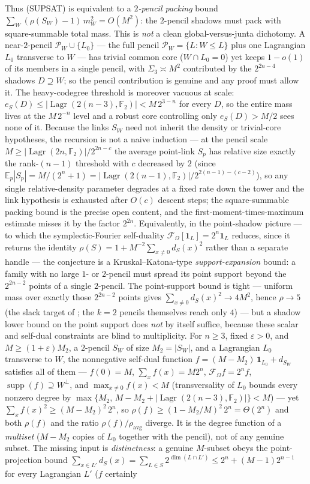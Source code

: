\documentclass[11pt,a4paper]{article}
\theoremstyle{plain}
\theoremstyle{definition}
\newcommand{\F}{\mathbb{F}}
\DeclareMathOperator{\Lagr}{Lagr}
\begin{document}
Thus (SUPSAT) is equivalent to a \emph{$2$-pencil packing} bound $\sum_W (\rho(S_W)-1)\,m_W^2 = O(M^2)$: the $2$-pencil shadows must pack with square-summable total mass. This is \emph{not} a clean global-versus-junta dichotomy. A near-$2$-pencil $\mathcal P_W \cup \{L_0\}$ --- the full pencil $\mathcal P_W = \{L : W \le L\}$ plus one Lagrangian $L_0$ transverse to $W$ --- has trivial common core ($W \cap L_0 = 0$) yet keeps $1-o(1)$ of its members in a single pencil, with $\Sigma_3 \asymp M^2$ contributed by the $2^{2n-4}$ shadows $D \supseteq W$; so the pencil contribution is genuine and any proof must allow it. The heavy-codegree threshold is moreover vacuous at scale: $e_S(D) \le |\Lagr(2(n-3),\F_2)| < M\,2^{3-n}$ for every $D$, so the entire mass lives at the $M\,2^{-n}$ level and a robust core controlling only $e_S(D) > M/2$ sees none of it. Because the links $S_W$ need not inherit the density or trivial-core hypotheses, the recursion is not a naive induction --- at the pencil scale $M \ge |\Lagr(2n,\F_2)|/2^{2n-c}$ the average point-link $S_p$ has relative size exactly the rank-$(n-1)$ threshold with $c$ decreased by $2$ (since $\mathbb E_p|S_p| = M/(2^n+1) = |\Lagr(2(n-1),\F_2)|/2^{2(n-1)-(c-2)}$), so any single relative-density parameter degrades at a fixed rate down the tower and the link hypothesis is exhausted after $O(c)$ descent steps; the square-summable packing bound is the precise open content, and the first-moment-times-maximum estimate misses it by the factor $2^{2n}$. Equivalently, in the point-shadow picture --- to which the symplectic-Fourier self-duality $\mathcal F_\Omega[\mathbf 1_L]=2^n\mathbf 1_L$ reduces, since it returns the identity $\rho(S)=1+M^{-2}\sum_{x\neq 0}d_S(x)^2$ rather than a separate handle --- the conjecture is a Kruskal--Katona-type \emph{support-expansion} bound: a family with no large $1$- or $2$-pencil must spread its point support beyond the $2^{2n-2}$ points of a single $2$-pencil. The point-support bound is tight --- uniform mass over exactly those $2^{2n-2}$ points gives $\sum_{x\neq 0}d_S(x)^2\to 4M^2$, hence $\rho\to 5$ (the slack target of ; the $k=2$ pencils themselves reach only $4$) --- but a shadow lower bound on the point support does \emph{not} by itself suffice, because these scalar and self-dual constraints are blind to multiplicity. For $n\ge3$, fixed $\varepsilon>0$, and $M\ge(1+\varepsilon)M_2$, a $2$-pencil $S_W$ of size $M_2=|S_W|$, and a Lagrangian $L_0$ transverse to $W$, the nonnegative self-dual function $f=(M-M_2)\,\mathbf 1_{L_0}+d_{S_W}$ satisfies all of them --- $f(0)=M$, $\sum_x f(x)=M2^n$, $\mathcal F_\Omega f=2^n f$, $\operatorname{supp}(f)\supseteq W^{\perp}$, and $\max_{x\neq 0}f(x)<M$ (transversality of $L_0$ bounds every nonzero degree by $\max\{M_2,\,M-M_2+|\Lagr(2(n-3),\F_2)|\}<M$) --- yet $\sum_x f(x)^2\ge(M-M_2)^2\,2^n$, so $\rho(f)\ge(1-M_2/M)^2\,2^n=\Theta(2^n)$ and both $\rho(f)$ and the ratio $\rho(f)/\rho_{\mathrm{avg}}$ diverge. It is the degree function of a \emph{multiset} ($M-M_2$ copies of $L_0$ together with the pencil), not of any genuine subset. The missing input is \emph{distinctness}: a genuine $M$-subset obeys the point-projection bound $\sum_{x\in L'}d_S(x)=\sum_{L\in S}2^{\dim(L\cap L')}\le 2^n+(M-1)2^{n-1}$ for every Lagrangian $L'$ ($f$ certainly 
\end{document}
